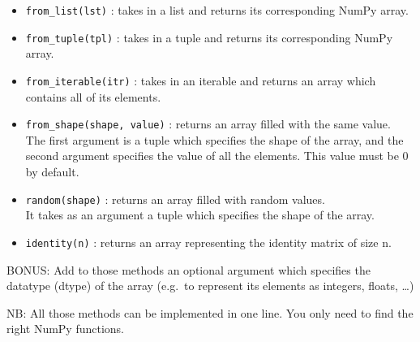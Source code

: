 \documentclass[]{article}
\begin{document}
\begin{itemize}
\item
  \texttt{from\_list(lst)} : takes in a list and returns its
  corresponding NumPy array.
\item
  \texttt{from\_tuple(tpl)} : takes in a tuple and returns its
  corresponding NumPy array.
\item
  \texttt{from\_iterable(itr)} : takes in an iterable and returns an
  array which contains all of its elements.
\item
  \texttt{from\_shape(shape,\ value)} : returns an array filled with the
  same value.\\
  The first argument is a tuple which specifies the shape of the array,
  and the second argument specifies the value of all the elements. This
  value must be 0 by default.
\item
  \texttt{random(shape)} : returns an array filled with random values.\\
  It takes as an argument a tuple which specifies the shape of the
  array.
\item
  \texttt{identity(n)} : returns an array representing the identity
  matrix of size n.
\end{itemize}

BONUS: Add to those methods an optional argument which specifies the
datatype (dtype) of the array (e.g.~to represent its elements as
integers, floats, \ldots{})

NB: All those methods can be implemented in one line. You only need to
find the right NumPy functions.
\end{document}
